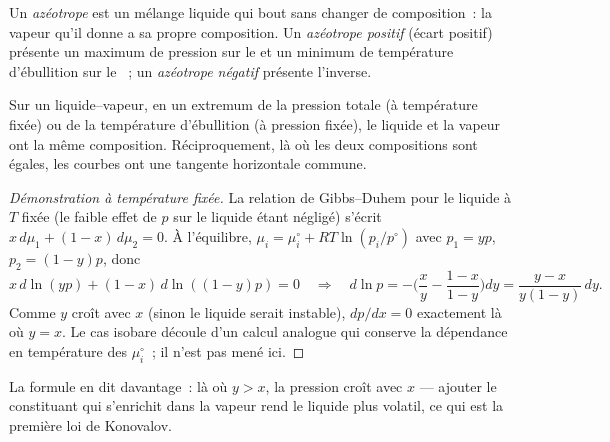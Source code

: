 \begin{definition}[Azéotrope]\label{def:b2:liquid-vapour-diagrams:azeotrope}
Un \emph{azéotrope} est un mélange liquide qui bout sans
changer de composition~: la vapeur qu'il donne a sa propre composition. Un
\emph{azéotrope positif} (écart positif) présente
un maximum de pression sur le  et un minimum de température
d'ébullition sur le ~; un \emph{azéotrope négatif}
présente l'inverse.
\end{definition}

\begin{theorem}\label{thm:b2:liquid-vapour-diagrams:konovalov}
Sur un  liquide--vapeur, en un extremum de la pression totale (à
température fixée) ou de la température d'ébullition (à pression fixée), le
liquide et la vapeur ont la même composition. Réciproquement, là où les
deux compositions sont égales, les courbes ont une tangente horizontale commune.
\end{theorem}

\begin{proof}[Démonstration à température fixée]
La relation de Gibbs--Duhem pour le liquide à $T$ fixée (le faible effet de $p$
sur le liquide étant négligé) s'écrit $x\,d\mu_1 + (1 - x)\,d\mu_2 = 0$. À l'équilibre,
$\mu_i = \mu_i^\circ + RT\ln(p_i/p^\circ)$ avec $p_1 = yp$, $p_2 = (1 - y)p$, donc
\[
  x\,d\ln(yp) + (1 - x)\,d\ln((1 - y)p) = 0
  \quad\Longrightarrow\quad
  d\ln p = -\Big(\frac{x}{y} - \frac{1 - x}{1 - y}\Big)dy
  = \frac{y - x}{y(1 - y)}\,dy .
\]
Comme $y$ croît avec $x$ (sinon le liquide serait instable),
$dp/dx = 0$ exactement là où $y = x$. Le cas isobare découle d'un
calcul analogue qui conserve la dépendance en température des $\mu_i^\circ$~; il n'est
pas mené ici.
\end{proof}

La formule en dit davantage~: là où $y > x$, la pression croît avec $x$ ---
ajouter le constituant qui s'enrichit dans la vapeur rend le liquide plus
volatil, ce qui est la première loi de Konovalov.


